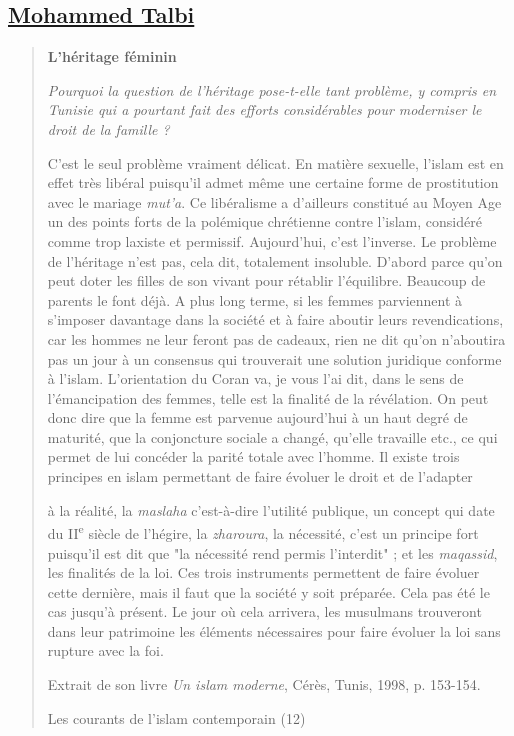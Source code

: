 \hypertarget{mohammed-talbi}{%
\subsection{\texorpdfstring{\underline{Mohammed
Talbi}}{Mohammed Talbi}}\label{mohammed-talbi}}

\begin{quote}
\textbf{L'héritage féminin}

\emph{Pourquoi la question de l'héritage pose-t-elle tant problème, y
compris en Tunisie qui a pourtant fait des efforts considérables pour
moderniser le droit de la famille ?}

C'est le seul problème vraiment délicat. En matière sexuelle, l'islam
est en effet très libéral puisqu'il admet même une certaine forme de
prostitution avec le mariage \emph{mut'a}. Ce libéralisme a d'ailleurs
constitué au Moyen Age un des points forts de la polémique chrétienne
contre l'islam, considéré comme trop laxiste et permissif. Aujourd'hui,
c'est l'inverse. Le problème de l'héritage n'est pas, cela dit,
totalement insoluble. D'abord parce qu'on peut doter les filles de son
vivant pour rétablir l'équilibre. Beaucoup de parents le font déjà. A
plus long terme, si les femmes parviennent à s'imposer davantage dans la
société et à faire aboutir leurs revendications, car les hommes ne leur
feront pas de cadeaux, rien ne dit qu'on n'aboutira pas un jour à un
consensus qui trouverait une solution juridique conforme à l'islam.
L'orientation du Coran va, je vous l'ai dit, dans le sens de
l'émancipation des femmes, telle est la finalité de la révélation. On
peut donc dire que la femme est parvenue aujourd'hui à un haut degré de
maturité, que la conjoncture sociale a changé, qu'elle travaille etc.,
ce qui permet de lui concéder la parité totale avec l'homme. Il existe
trois principes en islam permettant de faire évoluer le droit et de
l'adapter

à la réalité, la \emph{maslaha} c'est-à-dire l'utilité publique, un
concept qui date du II\textsuperscript{e} siècle de l'hégire, la
\emph{zharoura}, la nécessité, c'est un principe fort puisqu'il est dit
que "la nécessité rend permis l'interdit" ; et les \emph{maqassid}, les
finalités de la loi. Ces trois instruments permettent de faire évoluer
cette dernière, mais il faut que la société y soit préparée. Cela pas
été le cas jusqu'à présent. Le jour où cela arrivera, les musulmans
trouveront dans leur patrimoine les éléments nécessaires pour faire
évoluer la loi sans rupture avec la foi.

Extrait de son livre \emph{Un islam moderne}, Cérès, Tunis, 1998, p.
153-154.

Les courants de l'islam contemporain (12)
\end{quote}

